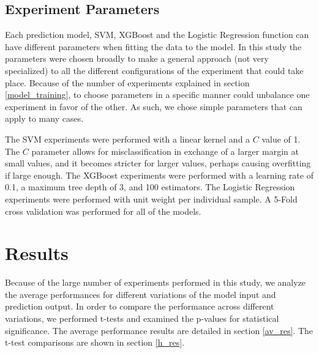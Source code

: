 \documentclass[review]{elsarticle}
\makeatletter
\newcommand*{\@rowstyle}{}
\newcommand*{\rowstyle}[1]{%
  \gdef\@rowstyle{#1}%
  \@rowstyle\ignorespaces%
}
\makeatother
\begin{document}

\subsection{Experiment Parameters}
\label{params}

Each prediction model, SVM, XGBoost and the Logistic Regression function can have different parameters when fitting the data to the model. In this study the parameters were chosen broadly to make a general approach (not very specialized) to all the different configurations of the experiment that could take place. Because of the number of experiments explained in section \ref{model_training}, to choose parameters in a specific manner could unbalance one experiment in favor of the other. As such, we chose simple parameters that can apply to many cases.

The SVM experiments were performed with a linear kernel and a \(C\) value of 1. The \(C\) parameter allows for misclassification in exchange of a larger margin at small values, and it becomes stricter for larger values, perhaps causing overfitting if large enough. The XGBoost experiments were performed with a learning rate of 0.1, a maximum tree depth of 3, and 100 estimators. The Logistic Regression experiments were performed with unit weight per individual sample. A 5-Fold cross validation was performed for all of the models.

\section{Results}
\label{results}

Because of the large number of experiments performed in this study, we analyze the average performances for different variations of the model input and prediction output. In order to compare the performance across different variations, we performed t-tests and examined the p-values for statistical significance. The average performance results are detailed in section \ref{av_res}. The t-test comparisons are shown in section \ref{h_res}.
\end{document}
